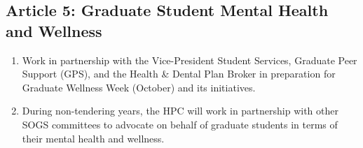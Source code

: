 \subsection{Article 5: Graduate Student Mental Health and Wellness}
\begin{enumerate}[label*=\arabic*., align=left]	
\item Work in partnership with the Vice-President Student Services, Graduate Peer Support (GPS), and the Health
\& Dental Plan Broker in preparation for Graduate Wellness Week (October) and its initiatives.
\item During non-tendering years, the HPC will work in partnership with other SOGS committees to advocate on
behalf of graduate students in terms of their mental health and wellness.
\end{enumerate}